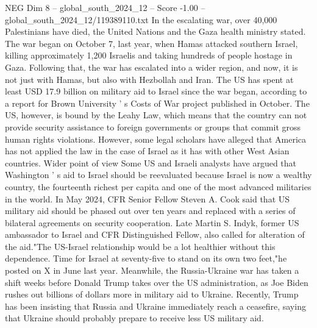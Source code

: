 \begin{textsample}{NEG Dim 8 – global\_south\_2024\_12 – Score -1.00 – global\_south\_2024\_12/119389110.txt}
In the escalating war, over 40,000 Palestinians have died, the United Nations and the Gaza health ministry stated.
The war began on October 7, last year, when Hamas attacked southern Israel, killing approximately 1,200 Israelis and taking hundreds of people hostage in Gaza.
Following that, the war has escalated into a wider region, and now, it is not just with Hamas, but also with Hezbollah and Iran.
The US has spent at least USD 17.9 billion on military aid to Israel since the war began, according to a report for Brown University ' s Costs of War project published in October.
The US, however, is bound by the Leahy Law, which means that the country can not provide security assistance to foreign governments or groups that commit gross human rights violations.
However, some legal scholars have alleged that America has not applied the law in the case of Israel as it has with other West Asian countries.
Wider point of view Some US and Israeli analysts have argued that Washington ' s aid to Israel should be reevaluated because Israel is now a wealthy country, the fourteenth richest per capita and one of the most advanced militaries in the world.
In May 2024, CFR Senior Fellow Steven A.
Cook said that US military aid should be phased out over ten years and replaced with a series of bilateral agreements on security cooperation.
Late Martin S.
Indyk, former US ambassador to Israel and CFR Distinguished Fellow, also called for alteration of the aid."The US-Israel relationship would be a lot healthier without this dependence.
Time for Israel at seventy-five to stand on its own two feet,"he posted on X in June last year.
Meanwhile, the Russia-Ukraine war has taken a shift weeks before Donald Trump takes over the US administration, as Joe Biden rushes out billions of dollars more in military aid to Ukraine.
Recently, Trump has been insisting that Russia and Ukraine immediately reach a ceasefire, saying that Ukraine should probably prepare to receive less US military aid.

\end{textsample}
